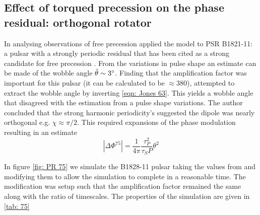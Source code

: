\documentclass[../full_thesis/full_thesis.tex]{subfiles}
\begin{document}

\subsection{Effect of torqued precession on the phase residual: orthogonal rotator}

In analysing observations of free precession \citet{Jones2001} applied the
model to PSR B1821-11: a pulsar with a strongly periodic residual that has been
cited as a strong candidate for free precession \citet{Stairs2000}. From the
variations in pulse shape an estimate can be made of the wobble angle
$\tilde{\theta} \sim 3^{\circ}$. Finding that the amplification factor was
important for this pulsar (it can be calculated to be $\approx 380$),
\citet{Jones2001} attempted to extract the wobble
angle by inverting \eqref{eqn: Jones 63}. This yields a wobble angle that
disagreed with the estimation from a pulse shape variations. The author
concluded that the strong harmonic periodicity's suggested the dipole was
nearly orthogonal e.g. $\chi \approx \pi/2$.  This required expansions of the
phase modulation resulting in an estimate
\begin{equation}
    |\Delta\Phi^{75}| = \frac{1}{4\pi} \frac{\tau_{P}^{2}}{\tau_{S} P} \theta^{2}
    \label{eqn: Jones 75}
\end{equation}

In figure \ref{fig: PR 75} we simulate the B1828-11 pulsar taking the values
from \citet{Stairs2000} and modifying them to allow the simulation to complete
in a reasonable time. The modification was setup such that the amplification
factor remained the same along with the ratio of timescales. The properties
of the simulation are given in \ref{tab: 75}
\end{document}
